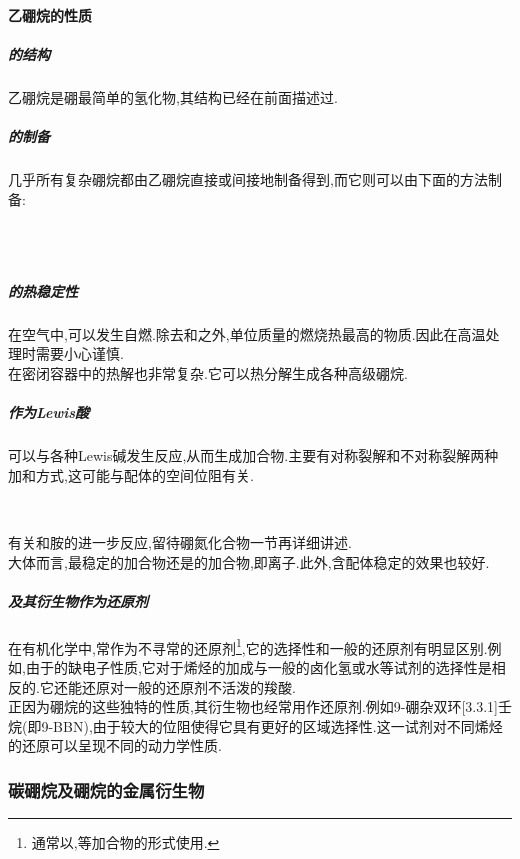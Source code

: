 \documentclass{ctexart}
\begin{document}
\paragraph{乙硼烷的性质}
\subparagraph{的结构}
乙硼烷是硼最简单的氢化物,其结构已经在前面描述过.
\subparagraph{的制备}几乎所有复杂硼烷都由乙硼烷直接或间接地制备得到,而它则可以由下面的方法制备:
\begin{center}
    \\
    \\
\end{center}
\subparagraph{的热稳定性}
在空气中,可以发生自燃.除去和之外,单位质量的燃烧热最高的物质.因此在高温处理时需要小心谨慎.\\
\indent {}在密闭容器中的热解也非常复杂.它可以热分解生成各种高级硼烷.
\subparagraph{作为Lewis酸}
可以与各种Lewis碱发生反应,从而生成加合物.主要有对称裂解和不对称裂解两种加和方式,这可能与配体的空间位阻有关.
\begin{center}
    \\
\end{center}
有关和胺的进一步反应,留待硼氮化合物一节再详细讲述.\\
\indent 大体而言,最稳定的加合物还是的加合物,即离子.此外,含配体稳定的效果也较好.
\subparagraph{及其衍生物作为还原剂}
在有机化学中,常作为不寻常的还原剂\footnote{通常以,等加合物的形式使用.},它的选择性和一般的还原剂有明显区别.例如,由于的缺电子性质,它对于烯烃的加成与一般的卤化氢或水等试剂的选择性是相反的.它还能还原对一般的还原剂不活泼的羧酸.\\
\indent 正因为硼烷的这些独特的性质,其衍生物也经常用作还原剂.例如9-硼杂双环[3.3.1]壬烷(即9-BBN),由于较大的位阻使得它具有更好的区域选择性.这一试剂对不同烯烃的还原可以呈现不同的动力学性质.
\subsubsection{碳硼烷及硼烷的金属衍生物}
\end{document}
